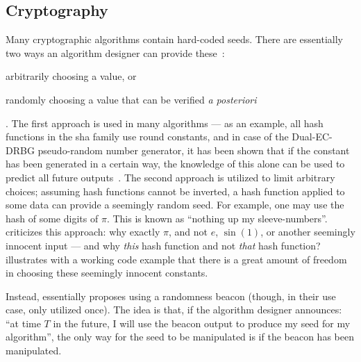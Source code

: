\subsection{Cryptography}\label{subsec:usecase_cryptography}
Many cryptographic algorithms contain hard-coded seeds.
There are essentially two ways an algorithm designer can provide these~\cite{baigneres2015trap}:
\begin{eromanate*}
    \item arbitrarily choosing a value, or
    \item randomly choosing a value that can be verified \emph{a posteriori}
\end{eromanate*}.
The first approach is used in many algorithms --- as an example, all hash functions in the \gls{sha} family use round constants, and in case of the Dual-EC-DRBG pseudo-random number generator, it has been shown that if the constant has been generated in a certain way, the knowledge of this alone can be used to predict all future outputs~\cite{dualec-paper}.
The second approach is utilized to limit arbitrary choices; assuming hash functions cannot be inverted, a hash function applied to some data can provide a seemingly random seed.
For example, one may use the hash of some digits of $\pi$. This is known as \enquote{nothing up my sleeve-numbers}.
\citet{bernstein2015manipulate} criticizes this approach: why exactly $\pi$, and not $e$, $\sin(1)$, or another seemingly innocent input --- and why \emph{this} hash function and not \emph{that} hash function?
\citet{backdoorsupmysleeve} illustrates with a working code example that there is a great amount of freedom in choosing these seemingly innocent constants.

Instead, \citet{baigneres2015trap} essentially proposes using a randomness beacon (though, in their use case, only utilized once).
The idea is that, if the algorithm designer announces: \enquote{at time $T$ in the future, I will use the beacon output to produce my seed for my algorithm}, the only way for the seed to be manipulated is if the beacon has been manipulated.
